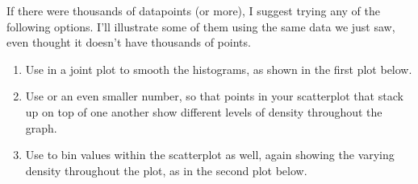 \documentclass[letterpaper,10pt,english]{jupyterBook}
\begin{document}
\noindent{}

\sphinxAtStartPar
If there were thousands of datapoints (or more), I suggest trying any of the following options.  I’ll illustrate some of them using the same data we just saw, even thought it doesn’t have thousands of points.
\begin{enumerate}
%
\item {} 
\sphinxAtStartPar
Use  in a joint plot to smooth the histograms, as shown in the first plot below.

\item {} 
\sphinxAtStartPar
Use  or an even smaller number, so that points in your scatterplot that stack up on top of one another show different levels of density throughout the graph.

\item {} 
\sphinxAtStartPar
Use  to bin values within the scatterplot as well, again showing the varying density throughout the plot, as in the second plot below.

\end{enumerate}

\begin{sphinxVerbatim}[commandchars=\\\{\}]
     
\end{sphinxVerbatim}

\noindent{}

\begin{sphinxVerbatim}[commandchars=\\\{\}]
     
\end{sphinxVerbatim}
\end{document}
